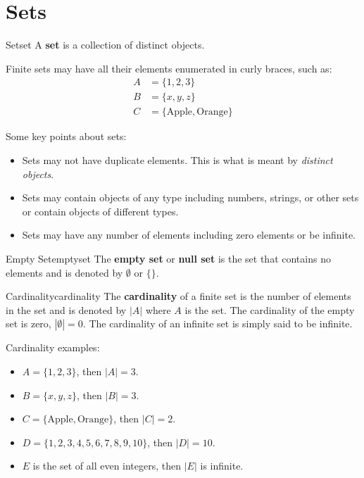 \section{Sets}

\begin{definition}{Set}{set}
  A \textbf{set} is a collection of distinct objects. 
\end{definition}

Finite sets may have all their elements enumerated in curly braces, such as:
\begin{align*}
  A &= \{ 1, 2, 3 \} \\
  B &= \{ x, y, z \} \\
  C &= \{ \text{Apple}, \text{Orange} \}
\end{align*}

Some key points about sets:
\begin{itemize}
  \item Sets may not have duplicate elements. This is what is meant by 
  \emph{distinct objects}.
  \item Sets may contain objects of any type including numbers, strings, or other sets
   or contain objects of different types.
  \item Sets may have any number of elements including zero elements or be infinite.
\end{itemize}

\begin{definition}{Empty Set}{emptyset}
  The \textbf{empty set} or \textbf{null set} is the set that contains no elements 
  and is denoted by \( \emptyset \) or \( \{ \} \).
\end{definition}

\begin{definition}{Cardinality}{cardinality}
  The \textbf{cardinality} of a finite set is the number of elements in the set and is 
  denoted by \( |A| \) where \( A \) is the set. The cardinality of the empty 
  set is zero, \( |\emptyset| = 0 \). The cardinality of an infinite set is simply said to be
  infinite.
\end{definition}

Cardinality examples:
\begin{itemize}
  \item \( A = \{ 1, 2, 3 \} \), then \( |A| = 3 \).
  \item \( B = \{ x, y, z \} \), then \( |B| = 3 \).
  \item \( C = \{ \text{Apple}, \text{Orange} \} \), then \( |C| = 2 \).
  \item \( D = \{ 1, 2, 3, 4, 5, 6, 7, 8, 9, 10 \} \), then \( |D| = 10 \).
  \item \( E \) is the set of all even integers, then \( |E| \) is infinite.
\end{itemize}

